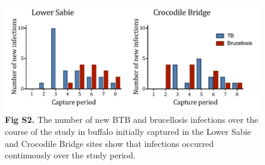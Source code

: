 \documentclass[11pt]{article}
\begin{document}
\begin{figure}[H]
\centering
\includegraphics[width=.99\linewidth]{Figure_S2.pdf}
\caption*{\textbf{Fig S2.} The number of new BTB and brucellosis infections over the course of the study in buffalo initially captured in the Lower Sabie and Crocodile Bridge sites show that infections occurred continuously over the study period.}
\end{figure}




\pagebreak



\end{document}
